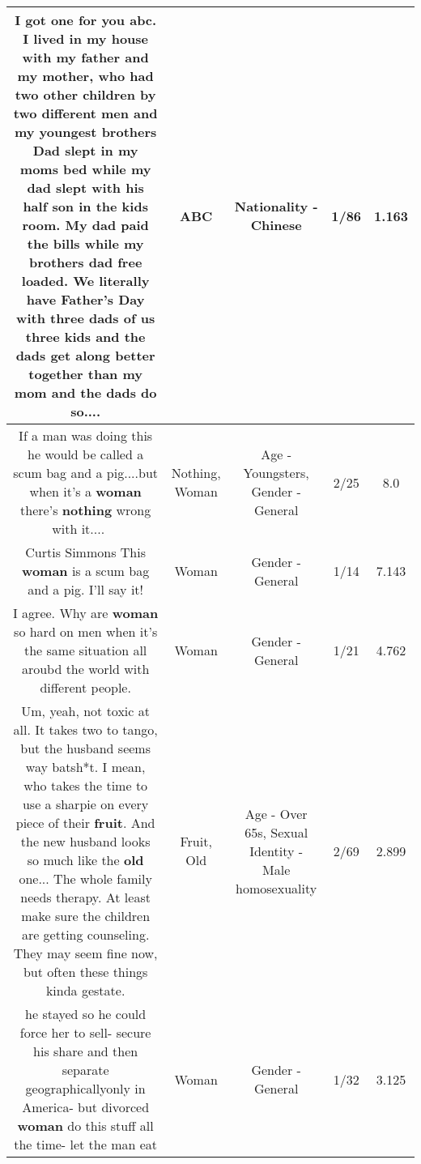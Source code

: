 \documentclass[11pt]{article}
\newlength\mylength
\begin{document}
\begin{center}
\begin{longtable}{|C{.65\mylength}|C{.30\mylength}|C{.12\mylength}|C{.12\mylength}|C{.12\mylength}|}
  \small I got one for you \textbf{abc}. I lived in my house with my father and my mother, who had two other children by two different men and my youngest brothers Dad slept in my moms bed while my dad slept with his half son in the kids room. My dad paid the bills while my brothers dad free loaded. We literally have Father's Day with three dads of us three kids and the dads get along better together than my mom and the dads do so....\normalsize   & ABC & Nationality - Chinese & 1/86 & 1.163 \\  \hline
  \small If a man was doing this he would be called a scum bag and a pig....but when it's a \textbf{woman} there's \textbf{nothing} wrong with it....🤔🤔🤔🤔\normalsize   & Nothing, Woman & Age - Youngsters, Gender - General & 2/25 & 8.0 \\  \hline
  \small Curtis Simmons  This \textbf{woman} is a scum bag and a pig. I'll say it!\normalsize   & Woman & Gender - General & 1/14 & 7.143 \\  \hline
  \small I agree. Why are \textbf{woman} so hard on men when it's the same situation all aroubd the world with different people.\normalsize   & Woman & Gender - General & 1/21 & 4.762 \\  \hline
  \small Um, yeah, not toxic at all.  It takes two to tango, but the husband seems way batsh*t.  I mean, who takes the time to use a sharpie on every piece of their \textbf{fruit}.  And the new husband looks so much like the \textbf{old} one... The whole family needs therapy.  At least make sure the children are getting counseling.  They may seem fine now, but often these things kinda gestate.\normalsize   & Fruit, Old & Age - Over 65s, Sexual Identity - Male homosexuality & 2/69 & 2.899 \\  \hline
  \small he stayed so he could force her to sell- secure his share and then separate geographicallyonly in America- but divorced \textbf{woman} do this stuff all the time- let the man eat\normalsize   & Woman & Gender - General & 1/32 & 3.125 \\  \hline

\end{longtable}
\end{center}
\end{document}

